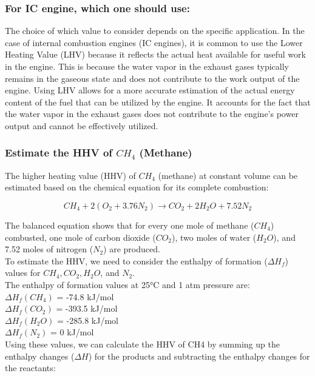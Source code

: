 \documentclass{article}
\begin{document}
\subsubsection*{For IC engine, which one should use:}
The choice of which value to consider depends on the specific application. In the case of internal combustion engines (IC engines), it is common to use the Lower Heating Value (LHV) because it reflects the actual heat available for useful work in the engine. This is because the water vapor in the exhaust gases typically remains in the gaseous state and does not contribute to the work output of the engine. Using LHV allows for a more accurate estimation of the actual energy content of the fuel that can be utilized by the engine. It accounts for the fact that the water vapor in the exhaust gases does not contribute to the engine's power output and cannot be effectively utilized.

\subsubsection*{Estimate the HHV of $CH_4$ (Methane)}
The higher heating value (HHV) of $CH_4$ (methane) at constant volume can be estimated based on the chemical equation for its complete combustion:

$$CH_4 + 2(O_2 + 3.76N_2) \rightarrow CO_2 + 2H_2O + 7.52N_2$$

The balanced equation shows that for every one mole of methane ($CH_4$) combusted, one mole of carbon dioxide ($CO_2$), two moles of water ($H_2O$), and 7.52 moles of nitrogen ($N_2$) are produced.\\



To estimate the HHV, we need to consider the enthalpy of formation ($\Delta H_f$) values for $CH_4, CO_2, H_2O$, and $N_2$.\\
The enthalpy of formation values at 25°C and 1 atm pressure are:\\
$\Delta H_f(CH_4)$ = -74.8 kJ/mol\\
$\Delta H_f(CO_2)$ = -393.5 kJ/mol\\
$ \Delta H_f(H_2O)$ = -285.8 kJ/mol\\
$\Delta H_f(N_2)$ = 0 kJ/mol\\

Using these values, we can calculate the HHV of CH4 by summing up the enthalpy changes ($\Delta H$) for the products and subtracting the enthalpy changes for the reactants:\\
\end{document}
